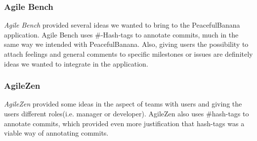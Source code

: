 \subsubsection{Agile Bench}
\emph{Agile Bench} provided several ideas we wanted to bring to the PeacefulBanana application. Agile Bench uses \#-Hash-tags to annotate commits, much in the same way we intended with PeacefulBanana. Also, giving users the possibility to attach feelings and general comments to specific milestones or issues are definitely ideas we wanted to integrate in the application.

\subsubsection{AgileZen}
\emph{AgileZen} provided some ideas in the aspect of teams with users and giving the users different roles(i.e. manager or developer). AgileZen also uses \#hash-tags to annotate commits, which provided even more justification that hash-tags was a viable way of annotating commits.  
